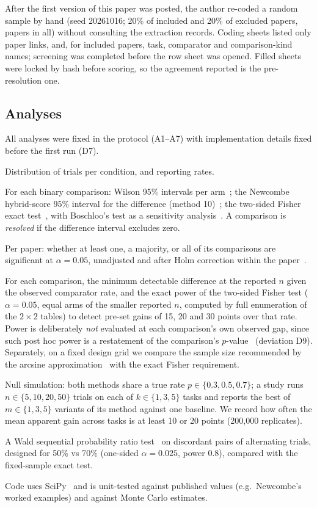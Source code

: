 \documentclass[11pt]{article}
\begin{document}
After the first version of this paper was posted, the author re-coded a random sample by hand (seed 20261016; 20\% of included and 20\% of excluded papers, \HumPapers{} papers in all) without consulting the extraction records. Coding sheets listed only paper links, and, for included papers, task, comparator and comparison-kind names; screening was completed before the row sheet was opened. Filled sheets were locked by hash before scoring, so the agreement reported is the pre-resolution one.

\subsection{Analyses}
All analyses were fixed in the protocol (A1--A7) with implementation details fixed before the first run (D7).
\begin{description}[leftmargin=1.2em,itemsep=2pt,font=\normalfont\itshape]
\item[A1--A2] Distribution of trials per condition, and reporting rates.
\item[A3] For each binary comparison: Wilson 95\% intervals per arm~\cite{wilson1927}; the Newcombe hybrid-score 95\% interval for the difference (method 10)~\cite{newcombe1998}; the two-sided Fisher exact test~\cite{fisher1922}, with Boschloo's test as a sensitivity analysis~\cite{boschloo1970}. A comparison is \emph{resolved} if the difference interval excludes zero.
\item[A4] Per paper: whether at least one, a majority, or all of its comparisons are significant at $\alpha=0.05$, unadjusted and after Holm correction within the paper~\cite{holm1979}.
\item[A5] For each comparison, the minimum detectable difference at the reported $n$ given the observed comparator rate, and the exact power of the two-sided Fisher test ($\alpha=0.05$, equal arms of the smaller reported $n$, computed by full enumeration of the $2\times2$ tables) to detect pre-set gains of 15, 20 and 30 points over that rate. Power is deliberately \emph{not} evaluated at each comparison's own observed gap, since such post hoc power is a restatement of the comparison's $p$-value~\cite{hoenig2001} (deviation D9). Separately, on a fixed design grid we compare the sample size recommended by the arcsine approximation~\cite{cohen1988} with the exact Fisher requirement.
\item[A6] Null simulation: both methods share a true rate $p\in\{0.3,0.5,0.7\}$; a study runs $n\in\{5,10,20,50\}$ trials on each of $k\in\{1,3,5\}$ tasks and reports the best of $m\in\{1,3,5\}$ variants of its method against one baseline. We record how often the mean apparent gain across tasks is at least 10 or 20 points (200{,}000 replicates).
\item[A7] A Wald sequential probability ratio test~\cite{wald1945} on discordant pairs of alternating trials, designed for 50\% vs 70\% (one-sided $\alpha=0.025$, power 0.8), compared with the fixed-sample exact test.
\end{description}
Code uses SciPy~\cite{scipy2020} and is unit-tested against published values (e.g.\ Newcombe's worked examples) and against Monte Carlo estimates.
\end{document}

